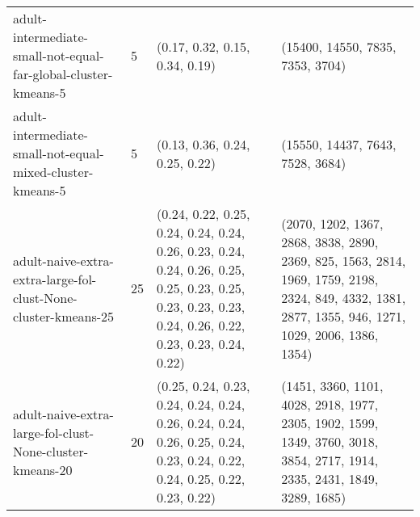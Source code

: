 \begin{longtable}{llll}
                                               adult-intermediate-small-not-equal-far-global-cluster-kmeans-5 &              5 &                                                                                                                                                                                                                                                                            (0.17, 0.32, 0.15, 0.34, 0.19) &                                                                                                                                                                                                                                                                          (15400, 14550, 7835, 7353, 3704) \\
                                                    adult-intermediate-small-not-equal-mixed-cluster-kmeans-5 &              5 &                                                                                                                                                                                                                                                                            (0.13, 0.36, 0.24, 0.25, 0.22) &                                                                                                                                                                                                                                                                          (15550, 14437, 7643, 7528, 3684) \\
                                               adult-naive-extra-extra-large-fol-clust-None-cluster-kmeans-25 &             25 &                                                                                                                                                    (0.24, 0.22, 0.25, 0.24, 0.24, 0.24, 0.26, 0.23, 0.24, 0.24, 0.26, 0.25, 0.25, 0.23, 0.25, 0.23, 0.23, 0.23, 0.24, 0.26, 0.22, 0.23, 0.23, 0.24, 0.22) &                                                                                                                                                       (2070, 1202, 1367, 2868, 3838, 2890, 2369, 825, 1563, 2814, 1969, 1759, 2198, 2324, 849, 4332, 1381, 2877, 1355, 946, 1271, 1029, 2006, 1386, 1354) \\
                                                     adult-naive-extra-large-fol-clust-None-cluster-kmeans-20 &             20 &                                                                                                                                                                                  (0.25, 0.24, 0.23, 0.24, 0.24, 0.24, 0.26, 0.24, 0.24, 0.26, 0.25, 0.24, 0.23, 0.24, 0.22, 0.24, 0.25, 0.22, 0.23, 0.22) &                                                                                                                                                                                  (1451, 3360, 1101, 4028, 2918, 1977, 2305, 1902, 1599, 1349, 3760, 3018, 3854, 2717, 1914, 2335, 2431, 1849, 3289, 1685) \\

\end{longtable}
